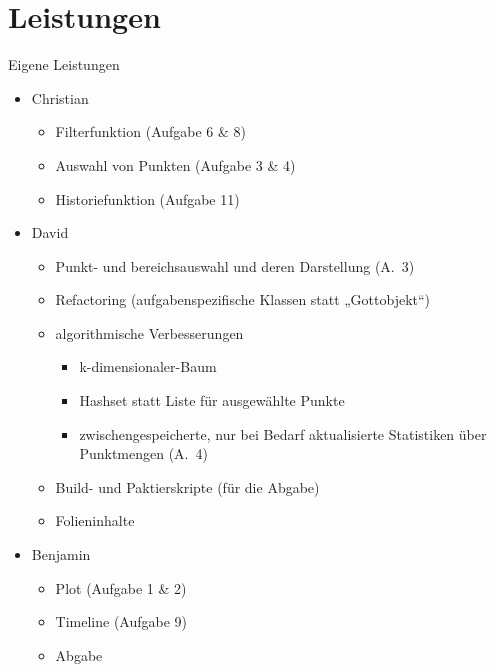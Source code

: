 \documentclass{beamer}
\begin{document}
    \section{Leistungen}
    \begin{frame}{Eigene Leistungen}
    	\begin{itemize}
	    	\setlength\itemsep{1em}
	    	\item Christian
	    	\begin{itemize}
	    		\item Filterfunktion (Aufgabe 6 \& 8)
	    		\item Auswahl von Punkten (Aufgabe 3 \& 4)
	    		\item Historiefunktion (Aufgabe 11)
	    	\end{itemize}
    		\item David
    		\begin{itemize}
    			\item Punkt- und bereichsauswahl und deren Darstellung (A.\ 3)
    			\item Refactoring (aufgabenspezifische Klassen statt „Gottobjekt“)
    			\item algorithmische Verbesserungen
    				\begin{itemize}
    					\item k-dimensionaler-Baum
    					\item Hashset statt Liste für ausgewählte Punkte
    					\item zwischengespeicherte, nur bei Bedarf aktualisierte Statistiken über Punktmengen (A.\ 4)
    				\end{itemize}
    			\item Build- und Paktierskripte (für die Abgabe)
    			\item Folieninhalte
    		\end{itemize}
    		\item Benjamin
    		\begin{itemize}
    			\item Plot (Aufgabe 1 \& 2)
    			\item Timeline (Aufgabe 9)
    			\item Abgabe
    		\end{itemize}
    	\end{itemize}
    \end{frame}
\end{document}
